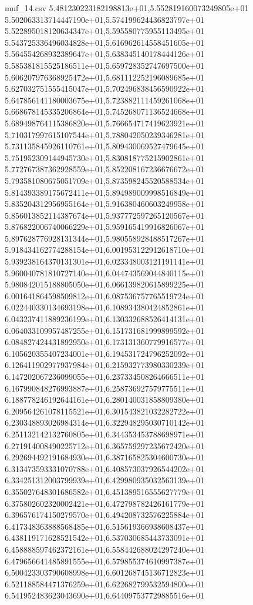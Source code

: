 \begin{filecontents*}{muf_14.csv}
5.481230223182198813e+01,5.552819160073249805e+01
5.502063313714447190e+01,5.574199624436823797e+01
5.522895018120634347e+01,5.595580775955113495e+01
5.543725336496034828e+01,5.616962614558451605e+01
5.564554268932389647e+01,5.638345140178444126e+01
5.585381815525186511e+01,5.659728352747697500e+01
5.606207976368925472e+01,5.681112252196089685e+01
5.627032751555415047e+01,5.702496838456590922e+01
5.647856141180003675e+01,5.723882111459261068e+01
5.668678145335206864e+01,5.745268071136524668e+01
5.689498764115386820e+01,5.766654717419623921e+01
5.710317997615107544e+01,5.788042050239346281e+01
5.731135845926110761e+01,5.809430069527479645e+01
5.751952309144945730e+01,5.830818775215902861e+01
5.772767387362928559e+01,5.852208167236676672e+01
5.793581080675051709e+01,5.873598245520588534e+01
5.814393389175672411e+01,5.894989009998516849e+01
5.835204312956955164e+01,5.916380460603249958e+01
5.856013852114387674e+01,5.937772597265120567e+01
5.876822006740066229e+01,5.959165419916826067e+01
5.897628776928131344e+01,5.980558928488517267e+01
5.918434162774288154e+01,6.001953122912618710e+01
5.939238164370131301e+01,6.023348003121191141e+01
5.960040781810727140e+01,6.044743569044840115e+01
5.980842015188805050e+01,6.066139820615899225e+01
6.001641864598509812e+01,6.087536757765519724e+01
6.022440330134693198e+01,6.108934380424852861e+01
6.043237411889236199e+01,6.130332688526414131e+01
6.064033109957487255e+01,6.151731681999899592e+01
6.084827424431892950e+01,6.173131360779916577e+01
6.105620355407234001e+01,6.194531724796252092e+01
6.126411902977937984e+01,6.215932773980330239e+01
6.147202067236099055e+01,6.237334508264666511e+01
6.167990848276993887e+01,6.258736927579775511e+01
6.188778246192644161e+01,6.280140031858809380e+01
6.209564261078115521e+01,6.301543821032282722e+01
6.230348893026984314e+01,6.322948295030710142e+01
6.251132142132760805e+01,6.344353453788698971e+01
6.271914008490225712e+01,6.365759297235672420e+01
6.292694492191684930e+01,6.387165825304600730e+01
6.313473593331070788e+01,6.408573037926544202e+01
6.334251312003799939e+01,6.429980935032563139e+01
6.355027648301686582e+01,6.451389516555627779e+01
6.375802602320002421e+01,6.472798782426161779e+01
6.396576174150279570e+01,6.494208732576225884e+01
6.417348363888568485e+01,6.515619366938608437e+01
6.438119171628521542e+01,6.537030685443733091e+01
6.458888597462372161e+01,6.558442688024297240e+01
6.479656641485891555e+01,6.579855374610997387e+01
6.500423303790608998e+01,6.601268745136712823e+01
6.521188584471376259e+01,6.622682799532594800e+01
6.541952483623043690e+01,6.644097537729885516e+01

\end{filecontents*}
